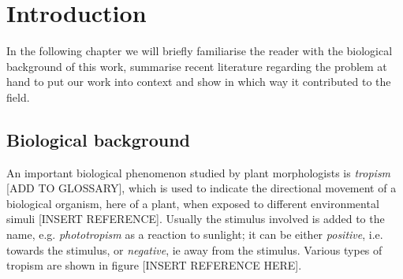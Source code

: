 
\chapter{Introduction} %

\label{introduction} %


\newcommand{\keyword}[1]{\textbf{#1}}
\newcommand{\tabhead}[1]{\textbf{#1}}
\newcommand{\code}[1]{\texttt{#1}}
\newcommand{\file}[1]{\texttt{\bfseries#1}}
\newcommand{\option}[1]{\texttt{\itshape#1}}



In the following chapter we will briefly familiarise the reader with the biological background of this work, summarise recent literature regarding the problem at hand to put our work into context and show in which way it contributed to the field.

\section{Biological background}

An important biological phenomenon studied by plant morphologists is \textit{tropism} [ADD TO GLOSSARY], which is used to indicate the directional movement of a biological organism, here of a plant, when exposed to different environmental simuli [INSERT REFERENCE]. Usually the stimulus involved is added to the name, e.g. \textit{phototropism} as a reaction to sunlight; it can be either \textit{positive}, i.e. towards the stimulus, or \textit{negative}, ie away from the stimulus. 
Various types of tropism are shown in figure [INSERT REFERENCE HERE].

